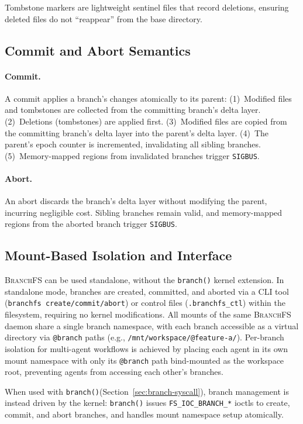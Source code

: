 \documentclass[sigconf]{acmart}
\newcommand{\sys}{\textsc{BranchFS}\xspace}
\newcommand{\syscall}{\texttt{branch()}\xspace}
\begin{document}
Tombstone markers are lightweight sentinel files that record deletions, ensuring deleted files do not ``reappear'' from the base directory.

\subsection{Commit and Abort Semantics}

\paragraph{Commit.}
A commit applies a branch's changes atomically to its parent:
(1)~Modified files and tombstones are collected from the committing branch's delta layer.
(2)~Deletions (tombstones) are applied first.
(3)~Modified files are copied from the committing branch's delta layer into the parent's delta layer.
(4)~The parent's epoch counter is incremented, invalidating all sibling branches.
(5)~Memory-mapped regions from invalidated branches trigger \texttt{SIGBUS}.

\paragraph{Abort.}
An abort discards the branch's delta layer without modifying the parent, incurring negligible cost. Sibling branches remain valid, and memory-mapped regions from the aborted branch trigger \texttt{SIGBUS}.

\subsection{Mount-Based Isolation and Interface}

\sys can be used standalone, without the \syscall kernel extension. In standalone mode, branches are created, committed, and aborted via a CLI tool (\texttt{branchfs create/\allowbreak commit/\allowbreak abort}) or control files (\texttt{.branchfs\_ctl}) within the filesystem, requiring no kernel modifications. All mounts of the same \sys daemon share a single branch namespace, with each branch accessible as a virtual directory via \texttt{@branch} paths (e.g., \texttt{/mnt/workspace/@feature-a/}). Per-branch isolation for multi-agent workflows is achieved by placing each agent in its own mount namespace with only its \texttt{@branch} path bind-mounted as the workspace root, preventing agents from accessing each other's branches.

When used with \syscall (Section~\ref{sec:branch-syscall}), branch management is instead driven by the kernel: \syscall issues \texttt{FS\_IOC\_BRANCH\_*} ioctls to create, commit, and abort branches, and handles mount namespace setup atomically.
\end{document}
